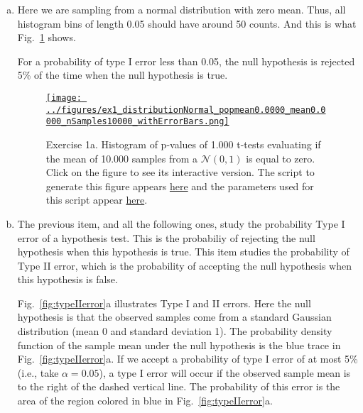 \documentclass[12pt]{article}
\def\fig_width{3.5in}
\begin{document}
\begin{enumerate}[(a)]

    \item Here we are sampling from a normal distribution with zero mean. Thus,
        all histogram bins of length 0.05 should have around 50 counts. And
        this is what Fig.~\ref{fig:ex1a} shows.

        For a probability of type I error less than 0.05, the null hypothesis
        is rejected 5\% of the time when the null hypothesis is true.

        \begin{figure}[H]
            \begin{center}
                \href{https://www.gatsby.ucl.ac.uk/~rapela/neuroinformatics/2023/ws1/figures/ex1_distributionNormal_popmean0.0000_mean0.0000_nSamples10000_withErrorBars.html}{\texttt{[image: ../figures/ex1\_distributionNormal\_popmean0.0000\_mean0.0000\_nSamples10000\_withErrorBars.png]}}

                \caption{Exercise 1a. Histogram of p-values of 1.000 t-tests
                evaluating if the mean of 10.000 samples from a $\mathcal{N}(0,
                1)$ is equal to zero.
                Click on the figure to see its interactive version.
                The script to generate this figure appears
                \href{https://github.com/joacorapela/neuroinformatics23/blob/master/worksheets/ws1/mySolution/code/scripts/doEx1WithErrorBars.py}{here} and the
                parameters used for this script appear
                \href{https://github.com/joacorapela/neuroinformatics23/blob/master/worksheets/ws1/mySolution/code/scripts/doEx1aWithErrorBars.csh}{here}.}

                \label{fig:ex1a}

            \end{center}
        \end{figure}

    \item  The previous item, and all the following ones, study the probability
        Type I error of a hypothesis test. This is the probabiliy of rejecting
        the null hypothesis when this hypothesis is true.
        This item studies the probability of Type II error, which is the
        probability of accepting the null hypothesis when this hypothesis is
        false.

        Fig.~\ref{fig:typeIIerror}a illustrates Type I
        and II errors. Here the null hypothesis is that the observed samples
        come from a standard Gaussian distribution (mean 0 and standard
        deviation 1). The probability density function of the sample mean
        under the null hypothesis is the blue trace in
        Fig.~\ref{fig:typeIIerror}a.
        If we accept a probability of type I error of at most 5\%
        (i.e., take $\alpha=0.05$), a type I error will occur if the
        observed sample mean is to the right of the dashed vertical line. The
        probability of this error is the area of the region colored in blue in
        Fig.~\ref{fig:typeIIerror}a.


\end{enumerate}
\end{document}

